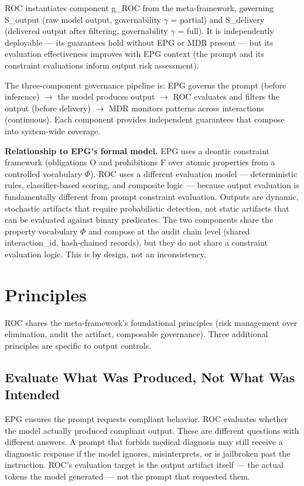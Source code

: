 ROC instantiates component g\_\allowbreak{}ROC from the meta-framework, governing S\_\allowbreak{}output (raw model output, governability $\gamma$ = partial) and S\_\allowbreak{}delivery (delivered output after filtering, governability $\gamma$ = full). It is independently deployable --- its guarantees hold without EPG or MDR present --- but its evaluation effectiveness improves with EPG context (the prompt and its constraint evaluations inform output risk assessment).

The three-component governance pipeline is: EPG governs the prompt (before inference) $\to$ the model produces output $\to$ ROC evaluates and filters the output (before delivery) $\to$ MDR monitors patterns across interactions (continuous). Each component provides independent guarantees that compose into system-wide coverage.

\textbf{Relationship to EPG's formal model.} EPG uses a deontic constraint framework (obligations O and prohibitions F over atomic properties from a controlled vocabulary $\Phi$). ROC uses a different evaluation model --- deterministic rules, classifier-based scoring, and composite logic --- because output evaluation is fundamentally different from prompt constraint evaluation. Outputs are dynamic, stochastic artifacts that require probabilistic detection, not static artifacts that can be evaluated against binary predicates. The two components share the property vocabulary $\Phi$ and compose at the audit chain level (shared interaction\_\allowbreak{}id, hash-chained records), but they do not share a constraint evaluation logic. This is by design, not an inconsistency.



\section{Principles}
\label{sec:controls-2}


ROC shares the meta-framework's foundational principles (risk management over elimination, audit the artifact, composable governance). Three additional principles are specific to output controls.

\subsection{Evaluate What Was Produced, Not What Was Intended}


EPG ensures the prompt requests compliant behavior. ROC evaluates whether the model actually produced compliant output. These are different questions with different answers. A prompt that forbids medical diagnosis may still receive a diagnostic response if the model ignores, misinterprets, or is jailbroken past the instruction. ROC's evaluation target is the output artifact itself --- the actual tokens the model generated --- not the prompt that requested them.

